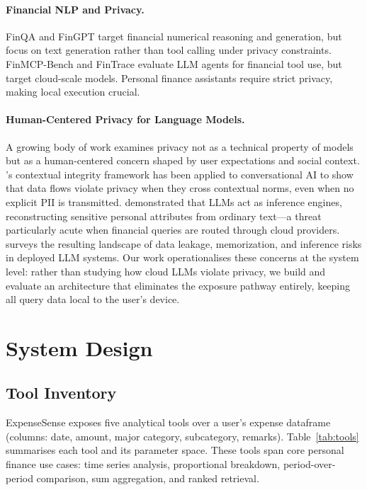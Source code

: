 \documentclass[11pt,twocolumn]{article}
\begin{document}
\paragraph{Financial NLP and Privacy.}
FinQA \citep{chen2022finqa} and FinGPT \citep{yang2023fingpt} target
financial numerical reasoning and generation, but focus on text
generation rather than tool calling under privacy constraints.
FinMCP-Bench \citep{finmcpbench2026} and FinTrace \citep{fintrace2026}
evaluate LLM agents for financial tool use, but target cloud-scale
models.
Personal finance assistants \citep{li2024personal} require strict
privacy, making local execution crucial.

\paragraph{Human-Centered Privacy for Language Models.}
A growing body of work examines privacy not as a technical property of
models but as a human-centered concern shaped by user expectations and
social context.
\citet{nissenbaum2004privacy}'s contextual integrity framework has
been applied to conversational AI to show that data flows violate
privacy when they cross contextual norms, even when no explicit PII is
transmitted.
\citet{staab2024memorization} demonstrated that LLMs act as inference
engines, reconstructing sensitive personal attributes from ordinary
text---a threat particularly acute when financial queries are routed
through cloud providers.
\citet{yao2024survey} surveys the resulting landscape of data
leakage, memorization, and inference risks in deployed LLM systems.
Our work operationalises these concerns at the system level: rather
than studying how cloud LLMs violate privacy, we build and evaluate an
architecture that eliminates the exposure pathway entirely, keeping
all query data local to the user's device.

\section{System Design}

\subsection{Tool Inventory}

ExpenseSense exposes five analytical tools over a user's expense
dataframe (columns: date, amount, major category, subcategory,
remarks).
Table~\ref{tab:tools} summarises each tool and its parameter space.
These tools span core personal finance use cases: time series
analysis, proportional breakdown, period-over-period comparison, sum
aggregation, and ranked retrieval.
\end{document}
